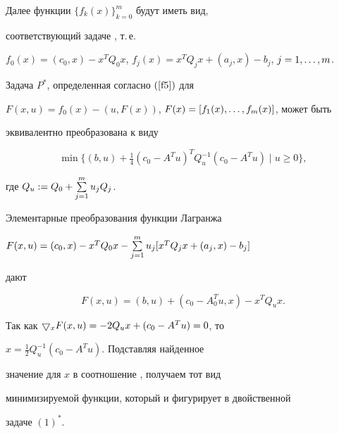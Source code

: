 Далее функции $\{f_k(x)\}_{k=0}^m$ будут иметь вид,


соответствующий задаче , т.\,е.{}


$f_0(x)=(c_0,x)-x^T Q_0 x$, $f_j(x)=x^T Q_j x +(a_j,x)-b_j$, $j=1,\dotsc,m$.





\begin{lem}


\label{l1}


Задача $P^*$, определенная согласно $\rf{f5}$ для


$F(x,u)=f_0(x)-(u,F(x))$, $F(x)=[f_1(x),\dotsc,f_m(x)]$, может быть


эквивалентно преобразована к виду


\begin{equation}


\min \{(b, u) + \tfrac{1}{ 4} (c_0-A^Tu)^T Q_u^{-1}


(c_0-A^Tu) \mid u\geq 0\},\tag*{$(1)^*$}


\end{equation}


где $Q_u:=Q_0+\sum\limits_{j=1}^{m} u_jQ_j$.


\end{lem}





\begin{pf}


Элементарные преобразования функции Лагранжа


$F(x,u)=(c_0,x)-x^T Q_0 x-\sum\limits_{j=1}^{m} u_j [x^T Q_j x +(a_j,x)-b_j]$


дают


\begin{equation}


\label{f6}


F(x, u) = (b, u) + (c_0-A_0^Tu, x) -x^T Q_u x.


\end{equation}


Так как $\bigtriangledown_x F(x, u) =-2Q_ux + (c_0-A^Tu)=0$, то


$x=\frac{1}{2} Q_u^{-1} (c_0-A^Tu)$. Подставляя найденное


значение для $x$ в соотношение , получаем тот вид


минимизируемой функции, который и фигурирует в двойственной


задаче $(1)^*$.


\end{pf}





